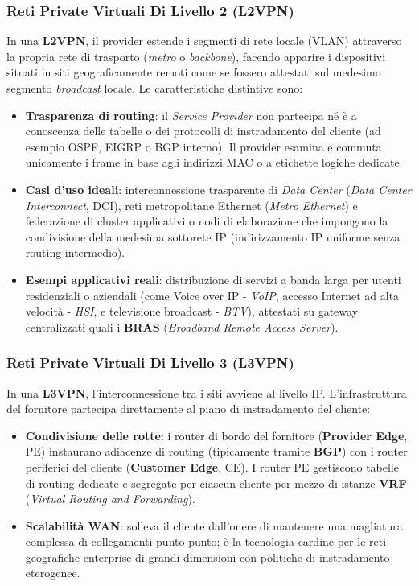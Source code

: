 \documentclass[11pt, a4paper]{article}
\begin{document}
\subsubsection{Reti Private Virtuali Di Livello 2 (L2VPN)}
In una \textbf{L2VPN}, il provider estende i segmenti di rete locale (VLAN) attraverso la propria rete di trasporto (\emph{metro} o \emph{backbone}), facendo apparire i dispositivi situati in siti geograficamente remoti come se fossero attestati sul medesimo segmento \emph{broadcast} locale.
Le caratteristiche distintive sono:
\begin{itemize}[noitemsep]
    \item \textbf{Trasparenza di routing}: il \emph{Service Provider} non partecipa né è a conoscenza delle tabelle o dei protocolli di instradamento del cliente (ad esempio OSPF, EIGRP o BGP interno). Il provider esamina e commuta unicamente i frame in base agli indirizzi MAC o a etichette logiche dedicate.
    \item \textbf{Casi d'uso ideali}: interconnessione trasparente di \emph{Data Center} (\emph{Data Center Interconnect}, DCI), reti metropolitane Ethernet (\emph{Metro Ethernet}) e federazione di cluster applicativi o nodi di elaborazione che impongono la condivisione della medesima sottorete IP (indirizzamento IP uniforme senza routing intermedio).
    \item \textbf{Esempi applicativi reali}: distribuzione di servizi a banda larga per utenti residenziali o aziendali (come Voice over IP - \emph{VoIP}, accesso Internet ad alta velocità - \emph{HSI}, e televisione broadcast - \emph{BTV}), attestati su gateway centralizzati quali i \textbf{BRAS} (\emph{Broadband Remote Access Server}).
\end{itemize}

\subsubsection{Reti Private Virtuali Di Livello 3 (L3VPN)}
In una \textbf{L3VPN}, l'interconnessione tra i siti avviene al livello IP. L'infrastruttura del fornitore partecipa direttamente al piano di instradamento del cliente:
\begin{itemize}[noitemsep]
    \item \textbf{Condivisione delle rotte}: i router di bordo del fornitore (\textbf{Provider Edge}, PE) instaurano adiacenze di routing (tipicamente tramite \textbf{BGP}) con i router periferici del cliente (\textbf{Customer Edge}, CE). I router PE gestiscono tabelle di routing dedicate e segregate per ciascun cliente per mezzo di istanze \textbf{VRF} (\emph{Virtual Routing and Forwarding}).
    \item \textbf{Scalabilità WAN}: solleva il cliente dall'onere di mantenere una magliatura complessa di collegamenti punto-punto; è la tecnologia cardine per le reti geografiche enterprise di grandi dimensioni con politiche di instradamento eterogenee.
\end{itemize}
\end{document}
